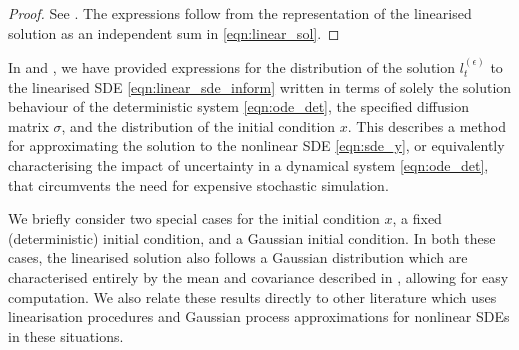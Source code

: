 \begin{proof}
	See .
	The expressions follow from the representation of the linearised solution as an independent sum in \eqref{eqn:linear_sol}.
\end{proof}
In  and , we have provided expressions for the distribution of the solution \(l_t^{(\epsilon)}\) to the linearised SDE \eqref{eqn:linear_sde_inform} written in terms of solely the solution behaviour of the deterministic system \eqref{eqn:ode_det}, the specified diffusion matrix \(\sigma\), and the distribution of the initial condition \(x\).
This describes a method for approximating the solution to the nonlinear SDE \eqref{eqn:sde_y}, or equivalently characterising the impact of uncertainty in a dynamical system \eqref{eqn:ode_det}, that circumvents the need for expensive stochastic simulation.


We briefly consider two special cases for the initial condition \(x\), a fixed (deterministic) initial condition, and a Gaussian initial condition.
In both these cases, the linearised solution also follows a Gaussian distribution which are characterised entirely by the mean and covariance described in , allowing for easy computation.
We also relate these results directly to other literature \cite{Jazwinski_2014_StochasticProcessesFiltering,FreidlinWentzell_1998_RandomPerturbationsDynamical,Blagoveshchenskii_1962_DiffusionProcessesDepending,Balasuriya_2020_StochasticSensitivityComputable,Sanz-AlonsoStuart_2017_GaussianApproximationsSmall,SarkkaSolin_2019_AppliedStochasticDifferential} which uses linearisation procedures and Gaussian process approximations for nonlinear SDEs in these situations.


